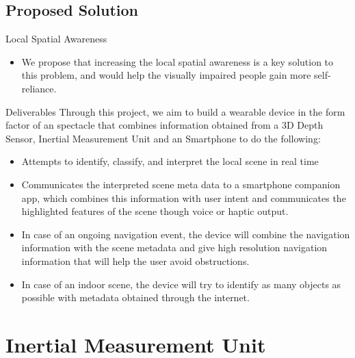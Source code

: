 \documentclass{beamer}
\begin{document}
\subsection{Proposed Solution}
\begin{frame}{Local Spatial Awareness}
  \begin{itemize}
  \item {
    We propose that increasing the local spatial awareness is a key solution to this problem, and would help the visually impaired people gain more self-reliance.
  }
  \end{itemize}
\end{frame}
\begin{frame}{Deliverables}
  Through this project, we aim to build a wearable device in the form factor of an spectacle that combines information obtained from a 3D Depth Sensor, Inertial Measurement Unit and an Smartphone to do the following:
  \begin{itemize}
  \item {
    Attempts to identify, classify, and interpret the local scene in real time
  }
  \item{
   Communicates the interpreted scene meta data to a smartphone companion app, which combines this information with user intent and communicates the highlighted features of the scene though voice or haptic output.
  }
  \item{
    In case of an ongoing navigation event, the device will combine the navigation information with the scene metadata and give high resolution navigation information that will help the user avoid obstructions.
  }
  \item{
    In case of an indoor scene, the device will try to identify as many objects as possible with metadata obtained through the internet.
  }
  \end{itemize}
\end{frame}

\section{Inertial Measurement Unit}
\end{document}
